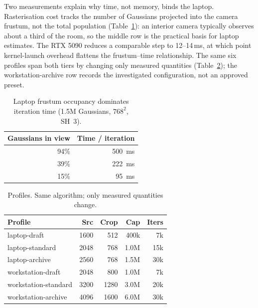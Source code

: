 Two measurements explain why time, not memory, binds the laptop. Rasterisation cost tracks
the number of Gaussians projected into the camera frustum, not the total population
(Table~\ref{tab:frustum}): an interior camera typically observes about a third of the room,
so the middle row is the practical basis for laptop estimates. The RTX 5090 reduces a
comparable step to 12--14\,ms, at which point kernel-launch overhead flattens the
frustum--time relationship. The same six profiles span both tiers by changing only measured
quantities (Table~\ref{tab:profiles}); the workstation-archive row records the investigated
configuration, not an approved preset.

\begin{table}[t]
\centering\small
\caption{Laptop frustum occupancy dominates iteration time (1.5M Gaussians, $768^2$, SH~3).
}
\label{tab:frustum}
\setlength{\tabcolsep}{5pt}
\begin{tabular}{@{}rr@{}}
\toprule
Gaussians in view & Time / iteration \\
\midrule
94\% & \SI{500}{\milli\second} \\
39\% & \SI{222}{\milli\second} \\
15\% & \SI{95}{\milli\second} \\
\bottomrule
\end{tabular}
\end{table}

\begin{table}[t]
\centering\small
\caption{Profiles. Same algorithm; only measured quantities change.
}
\label{tab:profiles}
\setlength{\tabcolsep}{3pt}
\begin{tabular}{@{}lrrrr@{}}
\toprule
Profile & Src & Crop & Cap & Iters \\
\midrule
laptop-draft       & 1600 & 512  & 400k & 7k \\
laptop-standard    & 2048 & 768  & 1.0M & 15k \\
laptop-archive     & 2560 & 768  & 1.5M & 30k \\
workstation-draft  & 2048 & 800  & 1.0M & 7k \\
workstation-standard & 3200 & 1280 & 3.0M & 20k \\
workstation-archive & 4096 & 1600 & 6.0M & 30k \\
\bottomrule
\end{tabular}
\end{table}


